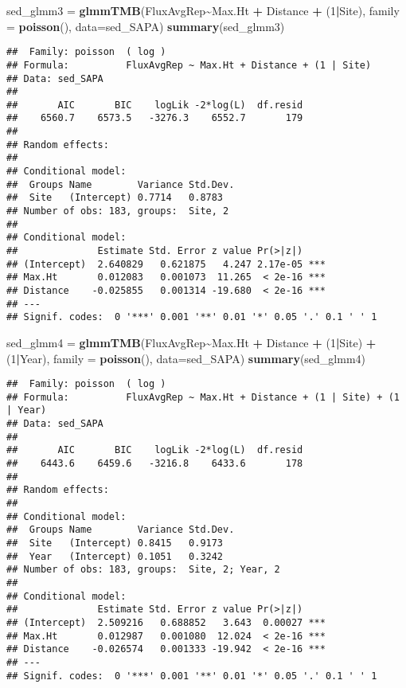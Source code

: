 \documentclass[
]{article}
\newenvironment{Shaded}{\begin{snugshade}}{\end{snugshade}}
\newcommand{\AttributeTok}[1]{\textcolor[rgb]{0.13,0.29,0.53}{#1}}
\newcommand{\DecValTok}[1]{\textcolor[rgb]{0.00,0.00,0.81}{#1}}
\newcommand{\FunctionTok}[1]{\textcolor[rgb]{0.13,0.29,0.53}{\textbf{#1}}}
\newcommand{\NormalTok}[1]{#1}
\newcommand{\OtherTok}[1]{\textcolor[rgb]{0.56,0.35,0.01}{#1}}
\newcommand{\SpecialCharTok}[1]{\textcolor[rgb]{0.81,0.36,0.00}{\textbf{#1}}}
\begin{document}
\begin{Shaded}
\begin{Highlighting}[]
\NormalTok{sed\_glmm3 }\OtherTok{=} \FunctionTok{glmmTMB}\NormalTok{(FluxAvgRep}\SpecialCharTok{\textasciitilde{}}\NormalTok{Max.Ht }\SpecialCharTok{+}\NormalTok{ Distance }\SpecialCharTok{+}\NormalTok{ (}\DecValTok{1}\SpecialCharTok{|}\NormalTok{Site), }\AttributeTok{family =} \FunctionTok{poisson}\NormalTok{(), }\AttributeTok{data=}\NormalTok{sed\_SAPA)}
\FunctionTok{summary}\NormalTok{(sed\_glmm3)}
\end{Highlighting}
\end{Shaded}

\begin{verbatim}
##  Family: poisson  ( log )
## Formula:          FluxAvgRep ~ Max.Ht + Distance + (1 | Site)
## Data: sed_SAPA
## 
##       AIC       BIC    logLik -2*log(L)  df.resid 
##    6560.7    6573.5   -3276.3    6552.7       179 
## 
## Random effects:
## 
## Conditional model:
##  Groups Name        Variance Std.Dev.
##  Site   (Intercept) 0.7714   0.8783  
## Number of obs: 183, groups:  Site, 2
## 
## Conditional model:
##              Estimate Std. Error z value Pr(>|z|)    
## (Intercept)  2.640829   0.621875   4.247 2.17e-05 ***
## Max.Ht       0.012083   0.001073  11.265  < 2e-16 ***
## Distance    -0.025855   0.001314 -19.680  < 2e-16 ***
## ---
## Signif. codes:  0 '***' 0.001 '**' 0.01 '*' 0.05 '.' 0.1 ' ' 1
\end{verbatim}

\begin{Shaded}
\begin{Highlighting}[]
\NormalTok{sed\_glmm4 }\OtherTok{=} \FunctionTok{glmmTMB}\NormalTok{(FluxAvgRep}\SpecialCharTok{\textasciitilde{}}\NormalTok{Max.Ht }\SpecialCharTok{+}\NormalTok{ Distance }\SpecialCharTok{+}\NormalTok{ (}\DecValTok{1}\SpecialCharTok{|}\NormalTok{Site) }\SpecialCharTok{+}\NormalTok{ (}\DecValTok{1}\SpecialCharTok{|}\NormalTok{Year), }\AttributeTok{family =} \FunctionTok{poisson}\NormalTok{(), }\AttributeTok{data=}\NormalTok{sed\_SAPA)}
\FunctionTok{summary}\NormalTok{(sed\_glmm4)}
\end{Highlighting}
\end{Shaded}

\begin{verbatim}
##  Family: poisson  ( log )
## Formula:          FluxAvgRep ~ Max.Ht + Distance + (1 | Site) + (1 | Year)
## Data: sed_SAPA
## 
##       AIC       BIC    logLik -2*log(L)  df.resid 
##    6443.6    6459.6   -3216.8    6433.6       178 
## 
## Random effects:
## 
## Conditional model:
##  Groups Name        Variance Std.Dev.
##  Site   (Intercept) 0.8415   0.9173  
##  Year   (Intercept) 0.1051   0.3242  
## Number of obs: 183, groups:  Site, 2; Year, 2
## 
## Conditional model:
##              Estimate Std. Error z value Pr(>|z|)    
## (Intercept)  2.509216   0.688852   3.643  0.00027 ***
## Max.Ht       0.012987   0.001080  12.024  < 2e-16 ***
## Distance    -0.026574   0.001333 -19.942  < 2e-16 ***
## ---
## Signif. codes:  0 '***' 0.001 '**' 0.01 '*' 0.05 '.' 0.1 ' ' 1
\end{verbatim}
\end{document}
